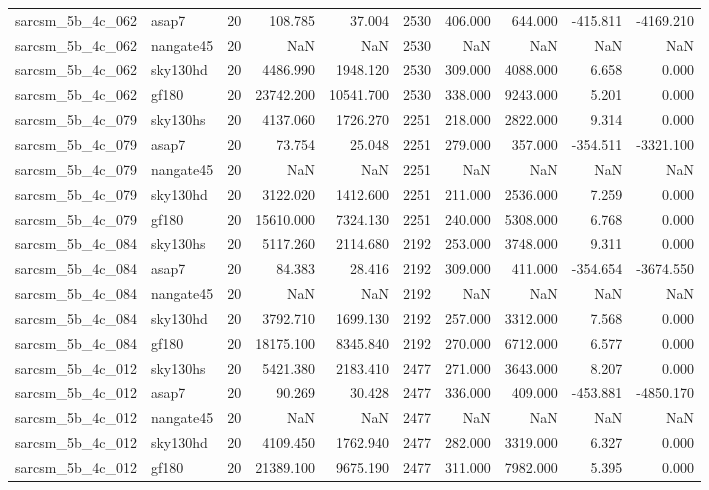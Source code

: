 \begin{longtable}{llrrrrrrrr}
sarcsm\_5b\_4c\_062 & asap7 & 20 & 108.785 & 37.004 & 2530 & 406.000 & 644.000 & -415.811 & -4169.210 \\
sarcsm\_5b\_4c\_062 & nangate45 & 20 & NaN & NaN & 2530 & NaN & NaN & NaN & NaN \\
sarcsm\_5b\_4c\_062 & sky130hd & 20 & 4486.990 & 1948.120 & 2530 & 309.000 & 4088.000 & 6.658 & 0.000 \\
sarcsm\_5b\_4c\_062 & gf180 & 20 & 23742.200 & 10541.700 & 2530 & 338.000 & 9243.000 & 5.201 & 0.000 \\
sarcsm\_5b\_4c\_079 & sky130hs & 20 & 4137.060 & 1726.270 & 2251 & 218.000 & 2822.000 & 9.314 & 0.000 \\
sarcsm\_5b\_4c\_079 & asap7 & 20 & 73.754 & 25.048 & 2251 & 279.000 & 357.000 & -354.511 & -3321.100 \\
sarcsm\_5b\_4c\_079 & nangate45 & 20 & NaN & NaN & 2251 & NaN & NaN & NaN & NaN \\
sarcsm\_5b\_4c\_079 & sky130hd & 20 & 3122.020 & 1412.600 & 2251 & 211.000 & 2536.000 & 7.259 & 0.000 \\
sarcsm\_5b\_4c\_079 & gf180 & 20 & 15610.000 & 7324.130 & 2251 & 240.000 & 5308.000 & 6.768 & 0.000 \\
sarcsm\_5b\_4c\_084 & sky130hs & 20 & 5117.260 & 2114.680 & 2192 & 253.000 & 3748.000 & 9.311 & 0.000 \\
sarcsm\_5b\_4c\_084 & asap7 & 20 & 84.383 & 28.416 & 2192 & 309.000 & 411.000 & -354.654 & -3674.550 \\
sarcsm\_5b\_4c\_084 & nangate45 & 20 & NaN & NaN & 2192 & NaN & NaN & NaN & NaN \\
sarcsm\_5b\_4c\_084 & sky130hd & 20 & 3792.710 & 1699.130 & 2192 & 257.000 & 3312.000 & 7.568 & 0.000 \\
sarcsm\_5b\_4c\_084 & gf180 & 20 & 18175.100 & 8345.840 & 2192 & 270.000 & 6712.000 & 6.577 & 0.000 \\
sarcsm\_5b\_4c\_012 & sky130hs & 20 & 5421.380 & 2183.410 & 2477 & 271.000 & 3643.000 & 8.207 & 0.000 \\
sarcsm\_5b\_4c\_012 & asap7 & 20 & 90.269 & 30.428 & 2477 & 336.000 & 409.000 & -453.881 & -4850.170 \\
sarcsm\_5b\_4c\_012 & nangate45 & 20 & NaN & NaN & 2477 & NaN & NaN & NaN & NaN \\
sarcsm\_5b\_4c\_012 & sky130hd & 20 & 4109.450 & 1762.940 & 2477 & 282.000 & 3319.000 & 6.327 & 0.000 \\
sarcsm\_5b\_4c\_012 & gf180 & 20 & 21389.100 & 9675.190 & 2477 & 311.000 & 7982.000 & 5.395 & 0.000 \\

\end{longtable}
